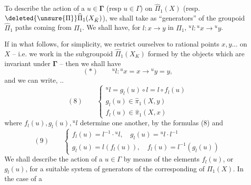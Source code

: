 To describe the action of a $u\in\mathbf{\Gamma}$ (resp $u\in\Gamma$) on $\widehat\Pi_1(X)$ (resp. $\deleted{\unsure{\Pi}}\widehat\Pi_1(X_{\bar K})$), we shall take as ``generators'' of the groupoid $\widehat\Pi_1$ paths coming from $\Pi_1$. We shall have, for ${l}:x\to y$ in $\Pi_1$, ${}^u{l}:{}^ux\to{}^uy$.

If  in what follows, for simplicity, we restrict ourselves to rational points $x,y\ldots$ on $X$ -- i.e. we work in the subgroupoid $\widehat\Pi_1(X_K)$ formed by the objects which are invariant under $\mathbf{\Gamma}$ -- then we shall have
\[
(*)\qquad{}^u{l}:{}^ux=x\longrightarrow{}^uy=y,
\]
and we can write, ..
\[
(8)\qquad\begin{cases}
{}^u{l}=g_{l}(u)\circ{l}={l}\circ f_{l}(u)\\
g_{l}(u)\in\widehat\pi_1(X,y)\\
f_{l}(u)\in\widehat\pi_1(X,x)
\end{cases}
\]
where $f_{l}(u),g_{l}(u),{}^u{l}$ determine one another,  by the formulas (8) and
\[
(9)\qquad\begin{cases}
f_{l}(u)={l}^{-1}\cdot{}^u{l},\quad g_{l}(u)={}^u{l}\cdot{l}^{-1}\\
g_{l}(u)={l}(f_{l}(u)),\quad f_{l}(u)={l}^{-1}(g_{l}(u))
\end{cases}
\]
We shall describe the action of a $u\in\Gamma$  by means of the elements $f_{l}(u)$, or $g_{l}(u)$, for a suitable system of generators of the corresponding  of $\Pi_1(X)$. In the case of a
